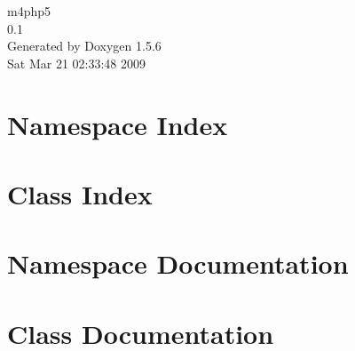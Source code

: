 \documentclass[a4paper]{book}
\begin{document}
\begin{titlepage}
\vspace*{7cm}
\begin{center}
{\Large m4php5 \\[1ex]\large 0.1 }\\
\vspace*{1cm}
{\large Generated by Doxygen 1.5.6}\\
\vspace*{0.5cm}
{\small Sat Mar 21 02:33:48 2009}\\
\end{center}
\end{titlepage}
\clearemptydoublepage
{}
\tableofcontents
\clearemptydoublepage
{}
\chapter{Namespace Index}

\chapter{Class Index}

\chapter{Namespace Documentation}




\chapter{Class Documentation}





















\printindex
\end{document}
